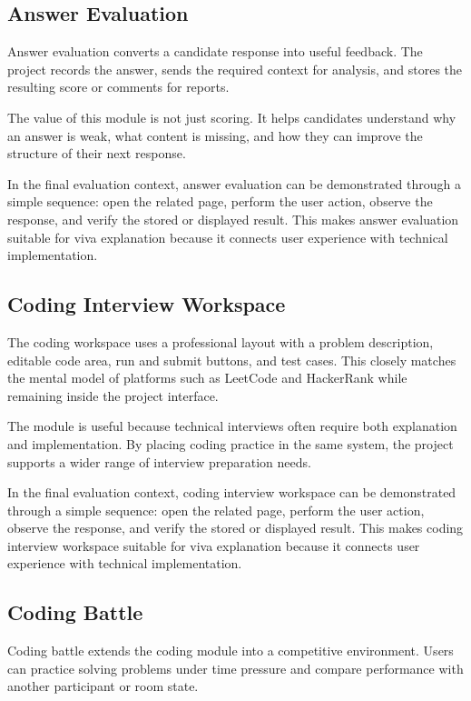 \documentclass[12pt,a4paper]{report}
\begin{document}
\subsection{Answer Evaluation}

Answer evaluation converts a candidate response into useful feedback. The project records the answer, sends the required context for analysis, and stores the resulting score or comments for reports.

The value of this module is not just scoring. It helps candidates understand why an answer is weak, what content is missing, and how they can improve the structure of their next response.

In the final evaluation context, answer evaluation can be demonstrated through a simple sequence: open the related page, perform the user action, observe the response, and verify the stored or displayed result. This makes answer evaluation suitable for viva explanation because it connects user experience with technical implementation.

\subsection{Coding Interview Workspace}

The coding workspace uses a professional layout with a problem description, editable code area, run and submit buttons, and test cases. This closely matches the mental model of platforms such as LeetCode and HackerRank while remaining inside the project interface.

The module is useful because technical interviews often require both explanation and implementation. By placing coding practice in the same system, the project supports a wider range of interview preparation needs.

In the final evaluation context, coding interview workspace can be demonstrated through a simple sequence: open the related page, perform the user action, observe the response, and verify the stored or displayed result. This makes coding interview workspace suitable for viva explanation because it connects user experience with technical implementation.

\subsection{Coding Battle}

Coding battle extends the coding module into a competitive environment. Users can practice solving problems under time pressure and compare performance with another participant or room state.
\end{document}
